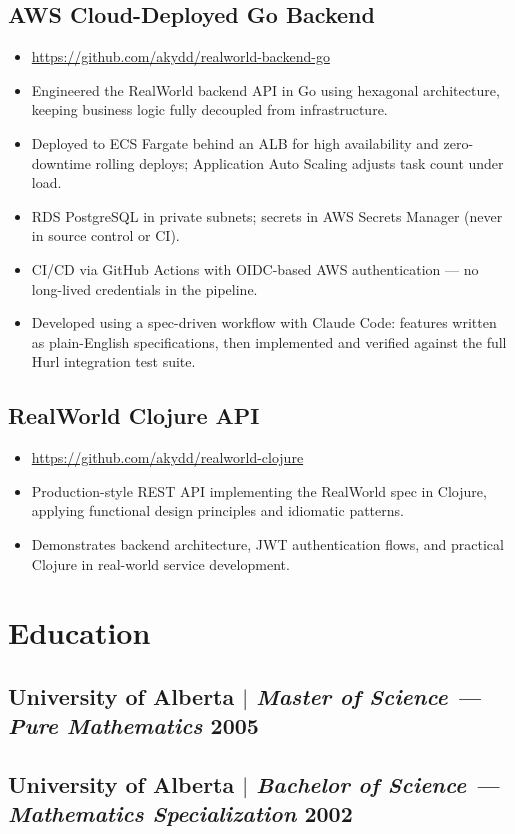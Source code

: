 \documentclass[10pt]{article}
\begin{document}
\subsection{AWS Cloud-Deployed Go Backend}
\begin{itemize}
  \item \url{https://github.com/akydd/realworld-backend-go}
  \item Engineered the RealWorld backend API in Go using hexagonal architecture, keeping business logic fully decoupled from infrastructure.
  \item Deployed to ECS Fargate behind an ALB for high availability and zero-downtime rolling deploys; Application Auto Scaling adjusts task count under load.
  \item RDS PostgreSQL in private subnets; secrets in AWS Secrets Manager (never in source control or CI).
  \item CI/CD via GitHub Actions with OIDC-based AWS authentication --- no long-lived credentials in the pipeline.
  \item Developed using a spec-driven workflow with Claude Code: features written as plain-English specifications, then implemented and verified against the full Hurl integration test suite.
\end{itemize}

\subsection{RealWorld Clojure API}
\begin{itemize}
    \item \url{https://github.com/akydd/realworld-clojure}
  \item Production-style REST API implementing the RealWorld spec in Clojure, applying functional design principles and idiomatic patterns.
  \item Demonstrates backend architecture, JWT authentication flows, and practical Clojure in real-world service development.
\end{itemize}

\section{Education}

\subsection{University of Alberta $|$ \normalfont\textit{Master of Science --- Pure Mathematics} \hfill 2005}
\subsection{University of Alberta $|$ \normalfont\textit{Bachelor of Science --- Mathematics Specialization} \hfill 2002}
\end{document}
